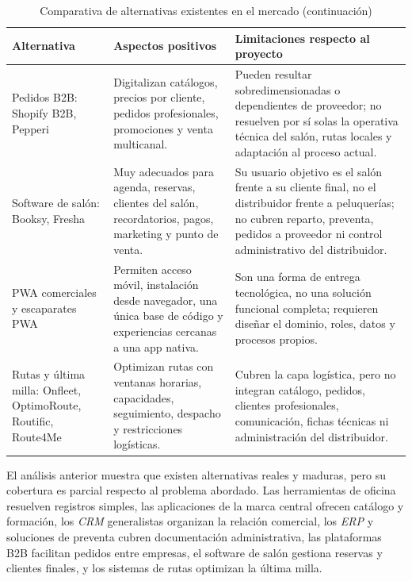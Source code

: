 {\begin{table}[H]
\centering
\ContinuedFloat
\caption[]{Comparativa de alternativas existentes en el mercado (continuación)}
\begin{tabularx}{\textwidth}{|>{\RaggedRight\arraybackslash}p{}|>{\RaggedRight\arraybackslash}X|>{\RaggedRight\arraybackslash}X|}
\hline
\rowcolor{black!8}
\textbf{Alternativa} & \textbf{Aspectos positivos} & \textbf{Limitaciones respecto al proyecto} \\
\hline
Pedidos B2B: Shopify B2B, Pepperi & Digitalizan catálogos, precios por cliente, pedidos profesionales, promociones y venta multicanal. & Pueden resultar sobredimensionadas o dependientes de proveedor; no resuelven por sí solas la operativa técnica del salón, rutas locales y adaptación al proceso actual. \\
\hline
Software de salón: Booksy, Fresha & Muy adecuados para agenda, reservas, clientes del salón, recordatorios, pagos, marketing y punto de venta. & Su usuario objetivo es el salón frente a su cliente final, no el distribuidor frente a peluquerías; no cubren reparto, preventa, pedidos a proveedor ni control administrativo del distribuidor. \\
\hline
PWA comerciales y escaparates PWA & Permiten acceso móvil, instalación desde navegador, una única base de código y experiencias cercanas a una app nativa. & Son una forma de entrega tecnológica, no una solución funcional completa; requieren diseñar el dominio, roles, datos y procesos propios. \\
\hline
Rutas y última milla: Onfleet, OptimoRoute, Routific, Route4Me & Optimizan rutas con ventanas horarias, capacidades, seguimiento, despacho y restricciones logísticas. & Cubren la capa logística, pero no integran catálogo, pedidos, clientes profesionales, comunicación, fichas técnicas ni administración del distribuidor. \\
\hline
\end{tabularx}
\end{table}
}

El análisis anterior muestra que existen alternativas reales y maduras, pero su cobertura es parcial respecto al problema abordado. Las herramientas de oficina resuelven registros simples, las aplicaciones de la marca central ofrecen catálogo y formación, los \textit{CRM} generalistas organizan la relación comercial, los \textit{ERP} y soluciones de preventa cubren documentación administrativa, las plataformas B2B facilitan pedidos entre empresas, el software de salón gestiona reservas y clientes finales, y los sistemas de rutas optimizan la última milla.

